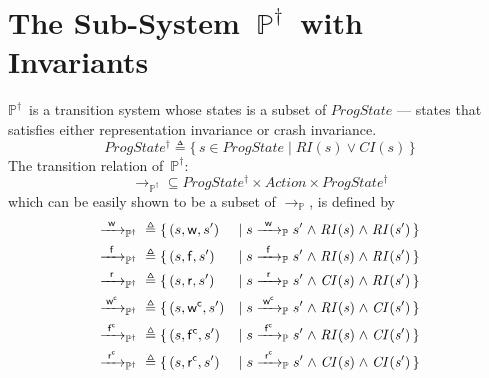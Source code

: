 \documentclass[letterpaper,twocolumn,10pt]{article}
\theoremstyle{definition}
\newcommand{\defeq}{{}\triangleq{}}
\newcommand{\conj}{\mathrel\land}
\newcommand{\awa}[2]{\hphantom{#1}\mathclap{#2}\hphantom{#1}} %
\renewcommand{\i}[1]{\ensuremath{\mathit{#1}}}
\newcommand{\Prog}{\ensuremath{\mathbb P}}
\newcommand{\ProgInv}{\ensuremath{\mathbb P^\dagger}}
\newcommand{\actw}{\mathsf w}
\newcommand{\actwc}{\mathsf w^\mathsf{c}}
\newcommand{\actf}{\mathsf f}
\newcommand{\actr}{\mathsf r}
\newcommand{\actfc}{\mathsf{f^c}}
\newcommand{\actrc}{\mathsf{r^c}}
\newcommand{\ttIn}[2]{\xrightarrow{#1}_{#2}}
\newcommand{\ttP}[1]{\ttIn{#1}{\Prog}}
\newcommand{\ttPI}[1]{\ttIn{#1}{\ProgInv}}
\begin{document}
\section{The Sub-System~\ProgInv\ with Invariants}
\label{sec:ProgInv}
\ProgInv\ is a transition system whose states is a subset of \i{ProgState} \---- states that satisfies either representation invariance or crash invariance. 
$$\i{ProgState^{\dagger}} \defeq{} \{\, s \in \i{ProgState} \mid \i{RI(s) \lor CI(s)} \,\}$$
The transition relation of~\ProgInv:
$$\ttPI{} \subseteq \i{ProgState^\dagger} \times \i{Action} \times \i{ProgState^\dagger}$$
which can be easily shown to be a subset of \i{\ttP{}}, is defined by
\begin{alignat*}{3}
	\ttPI{\awa{w}\actw} \defeq{}& \{\, (s, \actw, s')
	&\mid s \ttP{\awa{w}\actw} s' \conj \i{RI(s)} \conj \i{RI(s')} \,\} \\
	\ttPI{\awa{w}\actf} \defeq{}& \{\, (s, \actf, s') &\mid s \ttP{\awa{w}\actf} s' \conj \i{RI(s)} \conj \i{RI(s')} \,\} \\
	\ttPI{\awa{w}\actr} \defeq{}& \{\, (s, \actr, s') &\mid s \ttP{\awa{w}\actr} s' \conj \i{CI(s)} \conj \i{RI(s')} \,\} \\
	\ttPI{\awa{w}\actwc} \defeq{}& \{\, (s, \actwc, s') &\mid s \ttP{\awa{w}\actwc} s' \conj \i{RI(s)} \conj \i{CI(s')} \,\} \\
	\ttPI{\awa{w}\actfc} \defeq{}& \{\, (s, \actfc, s') &\mid s \ttP{\awa{w}\actfc} s' \conj \i{RI(s)} \conj \i{CI(s')} \,\} \\
	\ttPI{\awa{w}\actrc} \defeq{}& \{\, (s, \actrc, s') &\mid s \ttP{\awa{w}\actrc} s' \conj \i{CI(s)} \conj \i{CI(s')} \,\} 
\end{alignat*}
\end{document}
